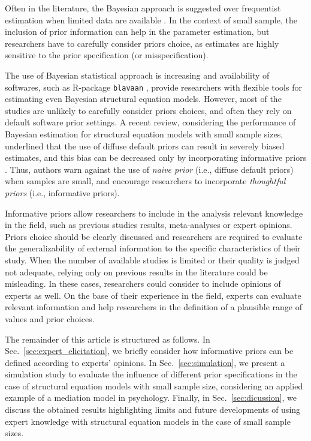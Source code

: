 \documentclass[graybox]{svmult}
\begin{document}
Often in the literature, the Bayesian approach is suggested over frequentist estimation when limited data are available \cite{mcneishUsingBayesianMethods2016a}.  In the context of small sample, the inclusion of prior information can help in the parameter estimation, but researchers have to carefully consider priors choice, as estimates are highly sensitive to the prior specification (or misspecification).

The use of Bayesian statistical approach is increasing and availability of softwares, such as R-package \texttt{blavaan} \cite{merkleBlavaanBayesianStructural2018},  provide researchers with flexible tools for estimating even Bayesian structural equation models. However, most of the studies are unlikely to carefully consider priors choices, and often they rely on default software prior settings. A recent review, considering the performance of Bayesian estimation for structural equation models with small sample sizes, underlined that the use of diffuse default priors can result in severely biased estimates, and this bias can be decreased only by incorporating informative priors \cite{smidBayesianFrequentistEstimation2020}. Thus, authors warn against the use of \emph{naive prior} (i.e., diffuse default priors) when samples are small, and encourage researchers to incorporate \emph{thoughtful priors} (i.e., informative priors).

Informative priors allow researchers to include in the analysis relevant knowledge in the field, such as previous studies results, meta-analyses or expert opinions. Priors choice should be clearly discussed and researchers are required to evaluate the generalizability of external information to the specific characteristics of their study. When the number of available studies is limited or their quality is judged not adequate, relying only on previous results in the literature could be misleading. In these cases, researchers could consider to include opinions of experts as well. On the base of their experience in the field, experts can evaluate relevant information and help researchers in the definition of a plausible range of values and prior choices.

The remainder of this article is structured as follows. In Sec.~\ref{sec:expert_elicitation}, we briefly consider how informative priors can be defined according to experts' opinions. In Sec.~\ref{sec:simulation}, we present a simulation study to evaluate the influence of different prior specifications in the case of structural equation models with small sample size, considering an applied example of a mediation model in psychology. Finally, in Sec.~\ref{sec:dicussion}, we discuss the obtained results highlighting limits and future developments of using expert knowledge with structural equation models in the case of  small sample sizes.
\end{document}
